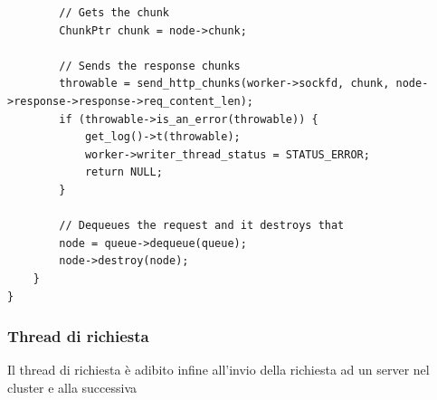 \documentclass[italian]{tktltiki2}
\begin{document}
\begin{lstlisting}
        // Gets the chunk
        ChunkPtr chunk = node->chunk;
        
        // Sends the response chunks
        throwable = send_http_chunks(worker->sockfd, chunk, node->response->response->req_content_len);
        if (throwable->is_an_error(throwable)) {
            get_log()->t(throwable);
            worker->writer_thread_status = STATUS_ERROR;
            return NULL;
        }

        // Dequeues the request and it destroys that
        node = queue->dequeue(queue);
        node->destroy(node);
    }
}
\end{lstlisting}

\subsubsection{Thread di richiesta}
\label{sec:request}
Il thread di richiesta è adibito infine all'invio della richiesta ad un server nel cluster e alla successiva 
\end{document}
